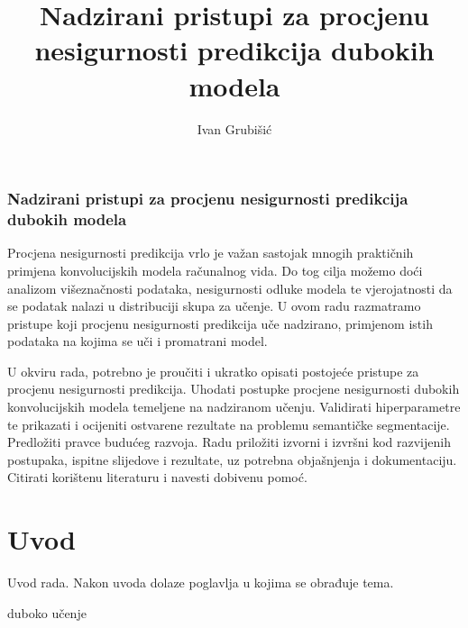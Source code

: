 \documentclass[utf8, diplomski, lmodern]{fer}
\begin{document}
\title{Nadzirani pristupi za procjenu nesigurnosti predikcija dubokih modela}
\author{Ivan Grubišić}
\maketitle

\izvornik
\subsection*{Nadzirani pristupi za procjenu nesigurnosti predikcija dubokih modela}

Procjena nesigurnosti predikcija vrlo je važan sastojak mnogih praktičnih primjena konvolucijskih modela računalnog vida. Do tog cilja možemo doći analizom višeznačnosti podataka, nesigurnosti odluke modela te vjerojatnosti da se podatak nalazi u distribuciji skupa za učenje. U ovom radu razmatramo pristupe koji procjenu nesigurnosti predikcija uče nadzirano, primjenom istih podataka na kojima se uči i promatrani model.

U okviru rada, potrebno je proučiti i ukratko opisati postojeće pristupe za procjenu nesigurnosti predikcija. Uhodati postupke procjene nesigurnosti dubokih konvolucijskih modela temeljene na nadziranom učenju. Validirati hiperparametre te prikazati i ocijeniti ostvarene rezultate na problemu semantičke segmentacije. Predložiti pravce budućeg razvoja.
Radu priložiti izvorni i izvršni kod razvijenih postupaka, ispitne slijedove i rezultate, uz potrebna objašnjenja i dokumentaciju. Citirati korištenu literaturu i navesti dobivenu pomoć.



\tableofcontents

\newpage

\begingroup
\onehalfspacing
\printunsrtglossary[type=symbols,style=supergroup,title={Oznake}]
\endgroup



\chapter{Uvod}
Uvod rada. Nakon uvoda dolaze poglavlja u kojima se obrađuje tema.

duboko učenje
\end{document}
